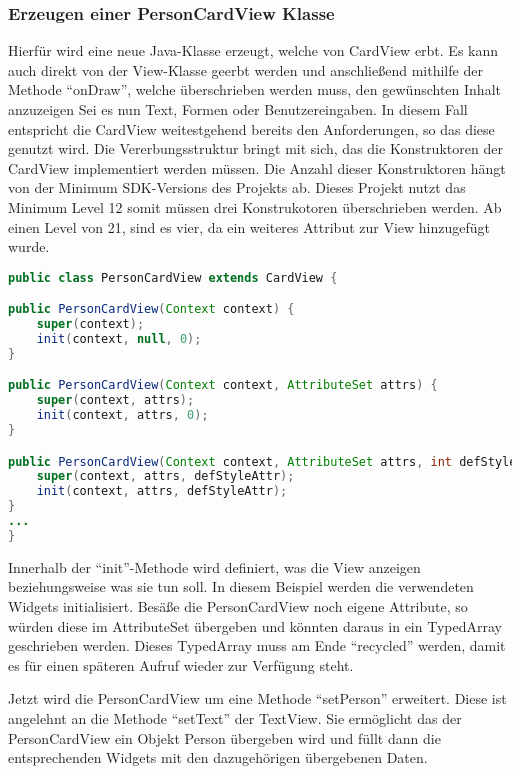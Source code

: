 \subsubsection{Erzeugen einer PersonCardView Klasse}

Hierfür wird eine neue Java-Klasse erzeugt, welche von CardView erbt. Es kann auch direkt von der View-Klasse geerbt werden und anschließend mithilfe der Methode \enquote{onDraw}, welche überschrieben werden muss, den gewünschten Inhalt anzuzeigen Sei es nun Text, Formen oder Benutzereingaben.
In diesem Fall entspricht die CardView weitestgehend bereits den Anforderungen, so das diese genutzt wird.
Die Vererbungsstruktur bringt mit sich, das die Konstruktoren der CardView implementiert werden müssen.
Die Anzahl dieser Konstruktoren hängt von der Minimum SDK-Versions des Projekts ab. Dieses Projekt nutzt das Minimum Level 12 somit müssen drei Konstrukotoren überschrieben werden. Ab einen Level von 21, sind es vier, da ein weiteres Attribut zur View hinzugefügt wurde.

\begin{lstlisting}[label=lst:personCardView,
language=java,
firstnumber=1,
caption=Konstruktoren der PersonCardView]				   
public class PersonCardView extends CardView {

public PersonCardView(Context context) {
	super(context);
	init(context, null, 0);
}

public PersonCardView(Context context, AttributeSet attrs) {
	super(context, attrs);
	init(context, attrs, 0);
}

public PersonCardView(Context context, AttributeSet attrs, int defStyleAttr) {
	super(context, attrs, defStyleAttr);
	init(context, attrs, defStyleAttr);
}
...
}
\end{lstlisting}

Innerhalb der \enquote{init}-Methode wird definiert, was die View anzeigen beziehungsweise was sie tun soll. 
In diesem Beispiel werden die verwendeten Widgets initialisiert. Besäße die PersonCardView noch eigene Attribute, so würden diese im AttributeSet übergeben und könnten daraus in ein TypedArray geschrieben werden. Dieses TypedArray muss am Ende \enquote{recycled} werden, damit es für einen späteren Aufruf wieder zur Verfügung steht.

Jetzt wird die PersonCardView um eine Methode \enquote{setPerson} erweitert. Diese ist angelehnt an die Methode \enquote{setText} der TextView. Sie ermöglicht das der PersonCardView ein Objekt Person übergeben wird und füllt dann die entsprechenden Widgets mit den dazugehörigen übergebenen Daten.

